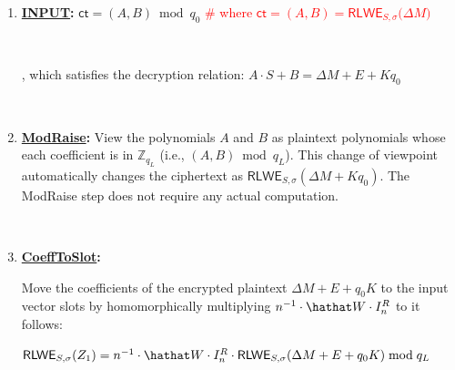 \begin{tcolorbox}[title={\textbf{\tboxlabel{\ref*{subsubsec:ckks-bootstrapping-summary}} CKKS Bootstrapping}}]

\begin{enumerate}
\item \textsf{\textbf{\underline{INPUT}:}} $\textsf{ct} = (A, B) \bmod q_0$ \textcolor{red}{ \# where $\textsf{ct}=(A, B) = \textsf{RLWE}_{S, \sigma}\bm(\Delta M \bm)$}

$ $

, which satisfies the decryption relation: $A\cdot S + B = \Delta M + E + Kq_0$ 

$ $

\item \textsf{\textbf{\underline{ModRaise}:}} View the polynomials $A$ and $B$ as plaintext polynomials whose each coefficient is in $\mathbb{Z}_{q_L}$ (i.e., $(A, B) \bmod q_L$). This change of viewpoint automatically changes the ciphertext as $\textsf{RLWE}_{S, \sigma}(\Delta M + Kq_0)$. The \textsf{ModRaise} step does not require any actual computation. 

$ $

\item \textsf{\textbf{\underline{CoeffToSlot}:}} 

Move the coefficients of the encrypted plaintext $\Delta M + E + q_0K$ to the input vector slots by homomorphically multiplying $n^{-1}\cdot \hathat W \cdot I_n^R$ to it follows: 

$\textsf{RLWE}_{S, \sigma}(Z_1) = n^{-1}\cdot \hathat W \cdot I_n^R \cdot \textsf{RLWE}_{S, \sigma}(\Delta M + E + q_0K) \bmod q_L$


\end{enumerate}
\end{tcolorbox}
